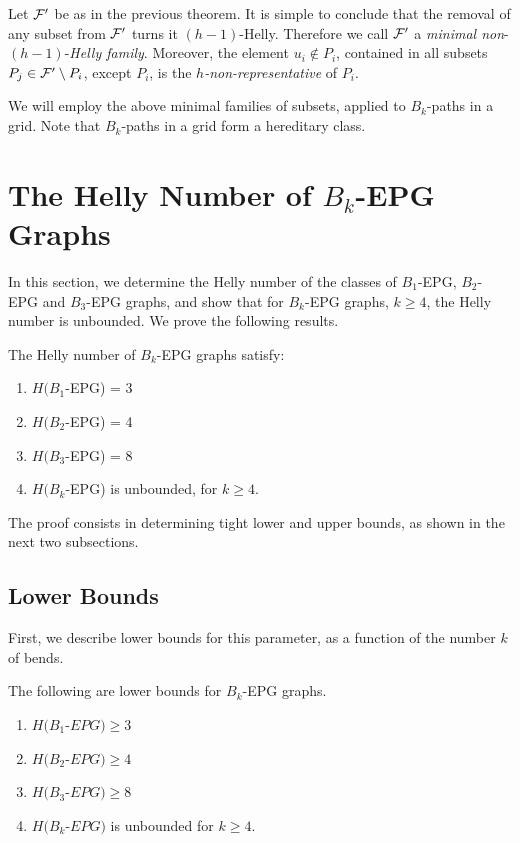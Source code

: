 Let $\cal{ F'}$ be as in the previous theorem. It is simple to conclude that the removal of any subset from $\cal {F'}$ turns it $(h-1)$-Helly.  Therefore we  call $\cal {F'}$ a {\it minimal non}-$(h-1)$-{\it Helly family}. Moreover, the element $u_i \not \in P_i$, contained in all subsets $P_j \in {\cal{F'}} \setminus P_i$, except $P_i$, is the {\it $h$-non-representative} of $P_i$.  

We will employ the above minimal families of subsets, applied to $B_k$-paths in a grid. Note that $B_k$-paths in a grid form a hereditary class. 

\section{The Helly Number of $B_k$-EPG Graphs}\label{sec:Helly-number}

In this section, we determine the Helly number of the classes of $B_1$-EPG, $B_2$-EPG and $B_3$-EPG graphs, and show that for $B_k$-EPG graphs, $k \geq 4$, the Helly number is unbounded. We prove the following results.

\begin{theorem}\label{thm:Helly-EPG}
The Helly number of $B_k$-EPG graphs satisfy:
\begin{enumerate}[nosep,label=\emph{(\roman*)}]
\item  $H(B_1$-EPG) = 3 
\item $H(B_2$-EPG)  = 4 
\item $H(B_3$-EPG)  = 8 
\item $H(B_k$-EPG) is unbounded, for 
$k \geq 4$.
\end{enumerate}

\end{theorem}

The proof consists in determining tight lower and upper bounds, as shown in the next two subsections. 

\subsection{Lower Bounds}

First, we describe lower bounds for this parameter,  as a function of the number $k$ of bends.

\begin{lema}\label{claim:lower-Bk-EPG} 
The following are lower bounds for $B_k$-EPG graphs.
\begin{enumerate}[nosep,label=\emph{(\roman*)}]
\item   $H(B_1$-$EPG) \geq 3$ 
\item $H(B_2$-$EPG) \geq 4$ 
\item $H(B_3$-$EPG) \geq 8$ 
\item $H(B_k$-$EPG )$ is unbounded for $k \geq 4$.
\end{enumerate}
\end{lema}

